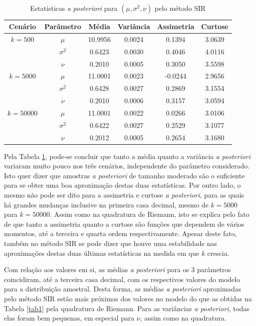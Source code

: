 \begin{table}[t]
	\caption{Estatísticas \textit{a posteriori} para $(\mu, \sigma^2, \nu)$ pelo método SIR}
	\label{tab2}
	\centering
	\begin{tabular}{cccccc}
		\toprule
		Cenário & Parâmetro & Média & Variância & Assimetria & Curtose \\
		\midrule
		$k = 500$ & $\mu$      & 10.9956 & 0.0024 & 0.1394 & 3.0639 \\
		          & $\sigma^2$ &  0.6423 & 0.0030 & 0.4046 & 4.0116 \\
		          & $\nu$      &  0.2010 & 0.0005 & 0.3050 & 3.5598 \\
		\midrule
		$k = 5000$ & $\mu$      & 11.0001 & 0.0023 & -0.0244 & 2.9656 \\
		           & $\sigma^2$ &  0.6428 & 0.0027 &  0.2869 & 3.1554 \\
		           & $\nu$      &  0.2010 & 0.0006 &  0.3157 & 3.0594 \\
		\midrule
		$k = 50000$ & $\mu$      & 11.0001 & 0.0022 & 0.0266 & 3.0106 \\
		            & $\sigma^2$ &  0.6422 & 0.0027 & 0.2529 & 3.1077 \\
		            & $\nu$      &  0.2012 & 0.0005 & 0.2654 & 3.1680 \\
		\bottomrule
	\end{tabular}
\end{table}

Pela Tabela \ref{tab2}, pode-se concluir que tanto a média quanto a variância \textit{a posteriori} variaram muito pouco nos três cenários, independente do parâmetro considerado. Isto quer dizer que amostras \textit{a posteriori} de tamanho moderado são o suficiente para se obter uma boa aproximação destas duas estatísticas. Por outro lado, o mesmo não pode ser dito para a assimetria e curtose \textit{a posteriori}, para as quais há grandes mudanças inclusive na primeira casa decimal, mesmo de $k=5000$ para $k=50000$. Assim como na quadratura de Riemann, isto se explica pelo fato de que tanto a assimetria quanto a curtose são funções que dependem de vários momentos, até a terceira e quarta ordem respectivamente. Apesar deste fato, também no método SIR se pode dizer que houve uma estabilidade nas aproximações destas duas últimas estatísticas na medida em que $k$ crescia.

Com relação aos valores em si, as médias \textit{a posteriori} para os 3 parâmetros coincidiram, até a terceira casa decimal, com os respectivos valores do modelo para a distribuição amostral. Desta forma, as médias \textit{a posteriori} aproximadas pelo método SIR estão mais próximas dos valores no modelo do que as obtidas na Tabela \ref{tab1} pela quadratura de Riemann. Para as variâncias \textit{a posteriori}, todas elas foram bem pequenas, em especial para $\nu$, assim como na quadratura.

